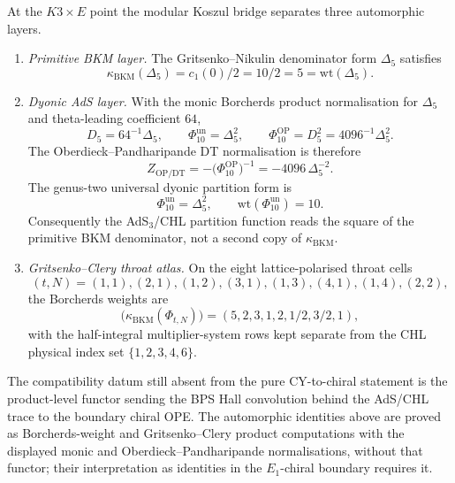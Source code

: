 \begin{proposition}
\label{prop:modkos-k3e-igusa-ads-gc-layers}
At the \(K3\times E\) point the modular Koszul bridge separates three
automorphic layers.
\begin{enumerate}[label=\textup{(\roman*)}]
\item \emph{Primitive BKM layer.} The Gritsenko--Nikulin denominator
form \(\Delta_5\) satisfies
\[
 \kappa_{\mathrm{BKM}}(\Delta_5)
 =
 c_1(0)/2
 =
 10/2
 =
 5
 =
 \mathrm{wt}(\Delta_5).
\]
\item \emph{Dyonic AdS layer.} With the monic Borcherds product
normalisation for \(\Delta_5\) and theta-leading coefficient \(64\),
\[
 D_5=64^{-1}\Delta_5,\qquad
 \Phi_{10}^{\mathrm{un}}=\Delta_5^2,\qquad
 \Phi_{10}^{\mathrm{OP}}=D_5^2=4096^{-1}\Delta_5^2.
\]
The Oberdieck--Pandharipande DT normalisation is therefore
\[
 Z_{\mathrm{OP}/\mathrm{DT}}
 =-\bigl(\Phi_{10}^{\mathrm{OP}}\bigr)^{-1}
 =-4096\,\Delta_5^{-2}.
\]
The genus-two universal dyonic partition form is
\[
 \Phi_{10}^{\mathrm{un}}=\Delta_5^2,\qquad
 \mathrm{wt}(\Phi_{10}^{\mathrm{un}})=10.
\]
Consequently the AdS\(_3\)/CHL partition function reads the square of
the primitive BKM denominator, not a second copy of
\(\kappa_{\mathrm{BKM}}\).
\item \emph{Gritsenko--Clery throat atlas.} On the eight
lattice-polarised throat cells
\[
 (t,N)=(1,1),(2,1),(1,2),(3,1),(1,3),(4,1),(1,4),(2,2),
\]
the Borcherds weights are
\[
 \bigl(\kappa_{\mathrm{BKM}}(\Phi_{t,N})\bigr)
 =
 (5,2,3,1,2,1/2,3/2,1),
\]
with the half-integral multiplier-system rows kept separate from the CHL
physical index set
\(\{1,2,3,4,6\}\).
\end{enumerate}
The compatibility datum still absent from the pure CY-to-chiral
statement is the product-level functor sending the BPS Hall
convolution behind the AdS/CHL trace to the boundary chiral OPE. The
automorphic identities above are proved as Borcherds-weight and
Gritsenko--Clery product computations with the displayed monic and
Oberdieck--Pandharipande normalisations, without that functor; their
interpretation as identities in the \(E_1\)-chiral boundary requires it.
\end{proposition}

